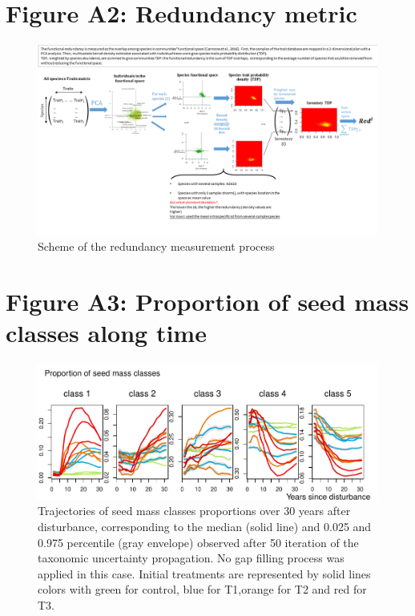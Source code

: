 \documentclass[fleqn,10pt]{ArtEcoFoG} %
\begin{document}
\section{\texorpdfstring{\textbf{Figure A2}: Redundancy
metric}{Figure A2: Redundancy metric}}\label{figure-a2-redundancy-metric}

\begin{figure}

{\centering \includegraphics[width=1\linewidth]{ExternalFig/RedundancyMetric} 

}

\caption{Scheme of the redundancy measurement process}\label{fig:RedMM}
\end{figure}

\section{\texorpdfstring{\textbf{Figure A3}: Proportion of seed mass
classes along
time}{Figure A3: Proportion of seed mass classes along time}}\label{figure-a3-proportion-of-seed-mass-classes-along-time}

\begin{figure}

{\centering \includegraphics[width=0.8\linewidth]{AppendixI_files/figure-latex/FigSeedMassClasses-1} 

}

\caption{Trajectories of seed mass classes proportions over 30 years after disturbance, corresponding to the median (solid line) and 0.025 and 0.975 percentile (gray envelope) observed after 50 iteration of the taxonomic uncertainty propagation. No gap filling process was applied in this case. Initial treatments are represented by solid lines colors with green for control, blue for T1,orange for T2 and red for T3.}\label{fig:FigSeedMassClasses}
\end{figure}
\end{document}

